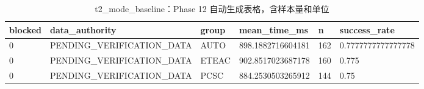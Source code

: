 \begin{table}[htbp]
\centering
\caption{t2_mode_baseline：Phase 12 自动生成表格，含样本量和单位}
\begin{tabular}{llllll}
\hline
blocked & data_authority & group & mean_time_ms & n & success_rate \\
\hline
0 & PENDING\_VERIFICATION\_DATA & AUTO & 898.1882716604181 & 162 & 0.7777777777777778 \\
0 & PENDING\_VERIFICATION\_DATA & ETEAC & 902.8517023687178 & 160 & 0.775 \\
0 & PENDING\_VERIFICATION\_DATA & PCSC & 884.2530503265912 & 144 & 0.75 \\
\hline
\end{tabular}
\end{table}
